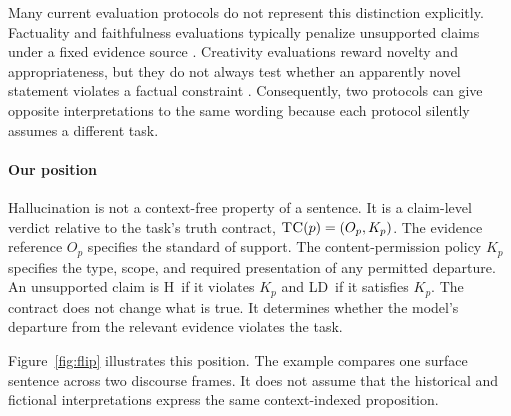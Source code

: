 \documentclass{clv2025}
\newcommand{\TC}{\textsc{TC}}
\newcommand{\LD}{\textsc{LD}}
\newcommand{\Hall}{\textsc{H}}
\begin{document}
Many current evaluation protocols do not represent this distinction explicitly.
Factuality and faithfulness evaluations typically penalize unsupported claims under a fixed evidence source \citep{maynez_faithfulness_2020,bang_hallulens_2025}.
Creativity evaluations reward novelty and appropriateness, but they do not always test whether an apparently novel statement violates a factual constraint \citep{acar_creativity_2019,hou_creativityprism_2025}.
Consequently, two protocols can give opposite interpretations to the same wording because each protocol silently assumes a different task.

\paragraph{Our position}
Hallucination is not a context-free property of a sentence.
It is a claim-level verdict relative to the task's truth contract, $\TC(p)=(O_p,K_p)$.
The evidence reference $O_p$ specifies the standard of support.
The content-permission policy $K_p$ specifies the type, scope, and required presentation of any permitted departure.
An unsupported claim is \Hall\ if it violates $K_p$ and \LD\ if it satisfies $K_p$.
The contract does not change what is true.
It determines whether the model's departure from the relevant evidence violates the task.

Figure~\ref{fig:flip} illustrates this position.
The example compares one surface sentence across two discourse frames.
It does not assume that the historical and fictional interpretations express the same context-indexed proposition.
\end{document}
